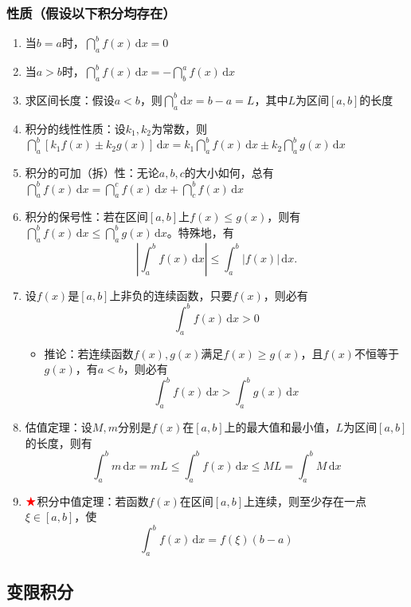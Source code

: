 \documentclass[../book.tex]{subfiles}
\begin{document}
    \subsubsection{性质（假设以下积分均存在）}

    \begin{enumerate}
        \item 当$b = a$时，$\dint_a^b f(x)\,\mathrm{d}x = 0$
        \item 当$a > b$时，$\dint_a^b f(x)\,\mathrm{d}x = -\dint_b^a f(x)\,\mathrm{d}x$
        \item 求区间长度：假设$a<b$，则$\dint_a^b \mathrm{d}x = b-a = L$，其中$L$为区间$[a, b]$的长度
        \item 积分的线性性质：设$k_1, k_2$为常数，则$\dint_a^b [k_{1}f(x)\pm k_{2}g(x)]\,\mathrm{d}x = k_{1}\dint_a^b f(x)\,\mathrm{d}x \pm k_{2}\dint_a^b g(x)\,\mathrm{d}x$
        \item 积分的可加（拆）性：无论$a, b, c$的大小如何，总有$\dint_a^b f(x)\,\mathrm{d}x = \dint_a^c f(x)\,\mathrm{d}x + \dint_c^b f(x)\,\mathrm{d}x$
        \item 积分的保号性：若在区间$[a, b]$上$f(x) \leq g(x)$，则有$\dint_a^b f(x)\,\mathrm{d}x \leq \dint_a^b g(x)\,\mathrm{d}x$。特殊地，有
        \[
            \left| \int_a^b f(x)\,\mathrm{d}x \right|
            \le
            \int_a^b |f(x)|\,\mathrm{d}x.
        \]
        \item 设$f(x)$是$[a, b]$上非负的连续函数，只要$f(x)${\color{red}{不恒等于零}}，则必有
        \[
            \int_a^b f(x)\,\mathrm{d}x > 0
        \]
        \begin{itemize}
            \item 推论：若连续函数$f(x), g(x)$满足$f(x) \geq g(x)$，且$f(x)$不恒等于$g(x)$，有$a < b$，则必有
            \[
                \int_a^b f(x)\,\mathrm{d}x > \int_a^b g(x)\,\mathrm{d}x
            \]
        \end{itemize}
        \item 估值定理：设$M, m$分别是$f(x)$在$[a, b]$上的最大值和最小值，$L$为区间$[a, b]$的长度，则有
        \[
            \int_a^b m\,\mathrm{d}x = mL \leq \int_a^b f(x)\,\mathrm{d}x \leq ML = \int_a^b M\,\mathrm{d}x
        \]
        \item $\color{red}{\bigstar}$积分中值定理：若函数$f(x)$在区间$[a, b]$上连续，则至少存在一点$\xi \in [a, b]$，使
        \[
            \int_a^b f(x)\,\mathrm{d}x = f(\xi)(b - a)
        \]
    \end{enumerate}

    \subsection{变限积分}
\end{document}
